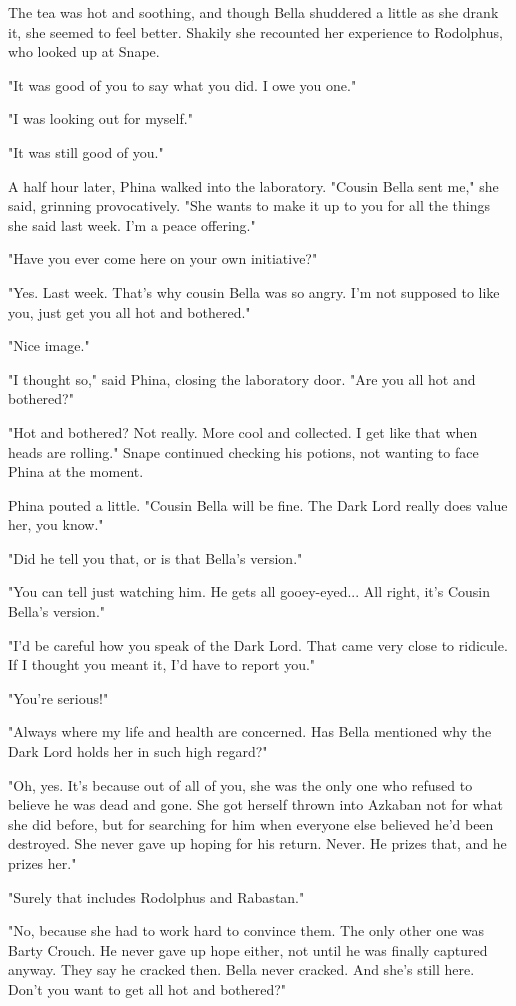 The tea was hot and soothing, and though Bella shuddered a little as she drank it, she seemed to feel better. Shakily she recounted her experience to Rodolphus, who looked up at Snape.

"It was good of you to say what you did. I owe you one."

"I was looking out for myself."

"It was still good of you."

A half hour later, Phina walked into the laboratory. "Cousin Bella sent me," she said, grinning provocatively. "She wants to make it up to you for all the things she said last week. I'm a peace offering."

"Have you ever come here on your own initiative?"

"Yes. Last week. That's why cousin Bella was so angry. I'm not supposed to like you, just get you all hot and bothered."

"Nice image."

"I thought so," said Phina, closing the laboratory door. "Are you all hot and bothered?"

"Hot and bothered? Not really. More cool and collected. I get like that when heads are rolling." Snape continued checking his potions, not wanting to face Phina at the moment.

Phina pouted a little. "Cousin Bella will be fine. The Dark Lord really does value her, you know."

"Did he tell you that, or is that Bella's version."

"You can tell just watching him. He gets all gooey-eyed... All right, it's Cousin Bella's version."

"I'd be careful how you speak of the Dark Lord. That came very close to ridicule. If I thought you meant it, I'd have to report you."

"You're serious!"

"Always where my life and health are concerned. Has Bella mentioned why the Dark Lord holds her in such high regard?"

"Oh, yes. It's because out of all of you, she was the only one who refused to believe he was dead and gone. She got herself thrown into Azkaban not for what she did before, but for searching for him when everyone else believed he'd been destroyed. She never gave up hoping for his return. Never. He prizes that, and he prizes her."

"Surely that includes Rodolphus and Rabastan."

"No, because she had to work hard to convince them. The only other one was Barty Crouch. He never gave up hope either, not until he was finally captured anyway. They say he cracked then. Bella never cracked. And she's still here. Don't you want to get all hot and bothered?"

